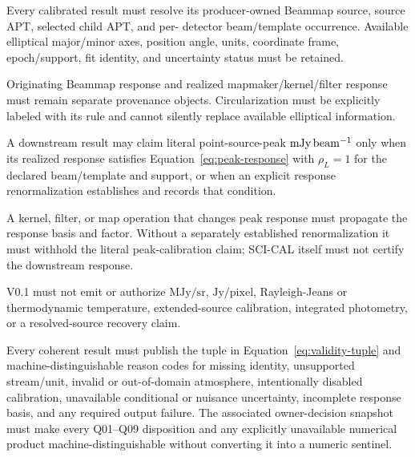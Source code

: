\begin{description}[style=nextline]
\item[\Req{040}: originating response basis.]
  Every calibrated result must resolve its producer-owned Beammap source,
  source APT, selected child APT, and per-
  detector beam/template occurrence. Available elliptical major/minor axes,
  position angle, units, coordinate frame, epoch/support, fit identity, and
  uncertainty status must be retained.

\item[\Req{041}: realized response distinction.]
  Originating Beammap response and realized mapmaker/kernel/filter response
  must remain separate provenance objects. Circularization must be explicitly
  labeled with its rule and cannot silently replace available elliptical
  information.

\item[\Req{042}: point-source-peak condition.]
  A downstream result may claim literal point-source-peak \(\mathrm{mJy\,beam^{-1}}\) only
  when its realized response satisfies Equation~\eqref{eq:peak-response} with
  \(\rho_L=1\) for the declared beam/template and support, or when an explicit
  response renormalization establishes and records that condition.

\item[\Req{043}: response-changing operations.]
  A kernel, filter, or map operation that changes peak response must propagate
  the response basis and factor. Without a separately established
  renormalization it must withhold the literal peak-calibration claim; SCI-CAL
  itself must not certify the downstream response.

\item[\Req{044}: excluded photometric meanings.]
  V0.1 must not emit or authorize \(\mathrm{MJy/sr}\), \(\mathrm{Jy/pixel}\),
  Rayleigh-Jeans or thermodynamic temperature, extended-source calibration,
  integrated photometry, or a resolved-source recovery claim.

\item[\Req{045}: validity tuple and causes.]
  Every coherent result must publish the tuple in
  Equation~\eqref{eq:validity-tuple} and machine-distinguishable reason codes
  for missing identity, unsupported stream/unit, invalid or out-of-domain
  atmosphere, intentionally disabled calibration, unavailable conditional or
  nuisance uncertainty, incomplete response basis, and any required output
  failure. The associated owner-decision snapshot must make every Q01--Q09
  disposition and any explicitly unavailable numerical product
  machine-distinguishable without converting it into a numeric sentinel.


\end{description}
